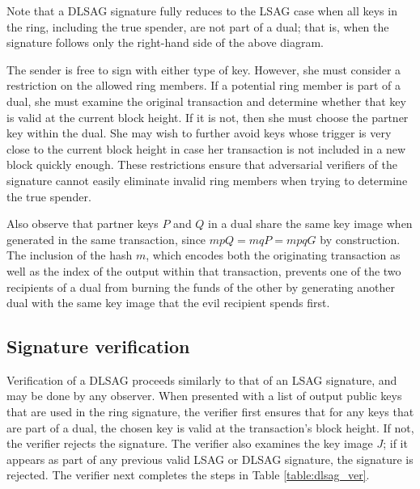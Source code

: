 \documentclass{mrl}
\begin{document}
Note that a DLSAG signature fully reduces to the LSAG case when all keys in the ring, including the true spender, are not part of a dual; that is, when the signature follows only the right-hand side of the above diagram.

The sender is free to sign with either type of key. However, she must consider a restriction on the allowed ring members. If a potential ring member is part of a dual, she must examine the original transaction and determine whether that key is valid at the current block height. If it is not, then she must choose the partner key within the dual. She may wish to further avoid keys whose trigger is very close to the current block height in case her transaction is not included in a new block quickly enough. These restrictions ensure that adversarial verifiers of the signature cannot easily eliminate invalid ring members when trying to determine the true spender.

Also observe that partner keys $P$ and $Q$ in a dual share the same key image when generated in the same transaction, since $mpQ = mqP = mpqG$ by construction. The inclusion of the hash $m$, which encodes both the originating transaction as well as the index of the output within that transaction, prevents one of the two recipients of a dual from burning the funds of the other by generating another dual with the same key image that the evil recipient spends first.

\subsection{Signature verification}
Verification of a DLSAG proceeds similarly to that of an LSAG signature, and may be done by any observer. When presented with a list of output public keys that are used in the ring signature, the verifier first ensures that for any keys that are part of a dual, the chosen key is valid at the transaction's block height. If not, the verifier rejects the signature. The verifier also examines the key image $J$; if it appears as part of any previous valid LSAG or DLSAG signature, the signature is rejected. The verifier next completes the steps in Table \ref{table:dlsag_ver}.
\end{document}
